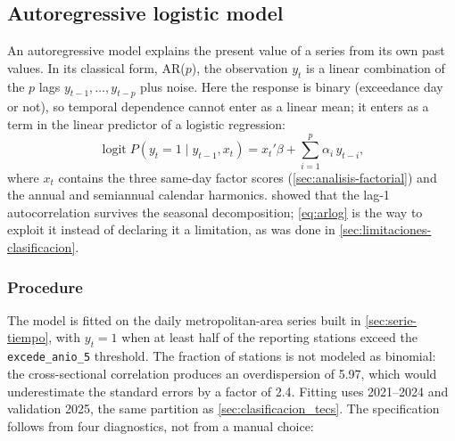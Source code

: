 \subsection{Autoregressive logistic model}\label{sec:autorregresivo}

An autoregressive model explains the present value of a series from its own
past values. In its classical form, AR($p$), the observation $y_t$ is a
linear combination of the $p$ lags $y_{t-1},\dots,y_{t-p}$ plus noise. Here
the response is binary (exceedance day or not), so temporal dependence cannot
enter as a linear mean; it enters as a term in the linear predictor of a
logistic regression:
\begin{equation}
  \operatorname{logit} P(y_t = 1 \mid y_{t-1}, x_t)
    = x_t'\beta + \sum_{i=1}^{p} \alpha_i\, y_{t-i},
  \label{eq:arlog}
\end{equation}
where $x_t$ contains the three same-day factor scores
(\cref{sec:analisis-factorial}) and the annual and semiannual calendar
harmonics.  showed that the lag-1 autocorrelation
survives the seasonal decomposition; \cref{eq:arlog} is the way to exploit it
instead of declaring it a limitation, as was done in
\cref{sec:limitaciones-clasificacion}.

\subsubsection{Procedure}

The model is fitted on the daily metropolitan-area series built in
\cref{sec:serie-tiempo}, with $y_t = 1$ when at least half of the reporting
stations exceed the \texttt{excede\_anio\_5} threshold. The fraction of
stations is not modeled as binomial: the cross-sectional correlation produces
an overdispersion of 5.97, which would underestimate the standard errors by a
factor of 2.4. Fitting uses 2021--2024 and validation 2025, the same
partition as \cref{sec:clasificacion_tecs}. The specification follows from
four diagnostics, not from a manual choice:

